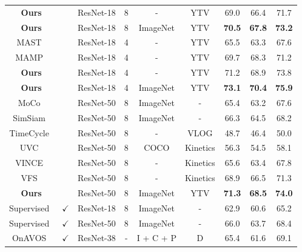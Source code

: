 \documentclass{article}
\begin{document}
\begin{table}[t]
{\begin{tabular}{ccccccccc}
			\textbf{Ours} & & ResNet-18 & 8 & - & YTV
			& 69.0 & 66.4 & 71.7 \\
      \textbf{Ours} & & ResNet-18 & 8 & ImageNet & YTV
			& \textbf{70.5} & \textbf{67.8} & \textbf{73.2} \\
      \hline
      MAST~\cite{lai2020mast} & & ResNet-18 & 4 & - & YTV
			& 65.5 & 63.3  & 67.6  \\
      MAMP~\cite{miao2021self} & & ResNet-18 & 4 & - & YTV
			& 69.7 & 68.3   & 71.2  \\
      \textbf{Ours} & & ResNet-18 & 4 & - & YTV
			& 71.2  & 68.9 & 73.8 \\
      \textbf{Ours} & & ResNet-18 & 4 & ImageNet & YTV
			& \textbf{73.1} & \textbf{70.4} & \textbf{75.9} \\
			\hline
      MoCo~\cite{he2020momentum} & & ResNet-50 & 8 & ImageNet &-
			& 65.4 & 63.2  & 67.6  \\
      SimSiam~\cite{chen2021exploring} & & ResNet-50 & 8 & ImageNet &-
			& 66.3 & 64.5  & 68.2  \\
      TimeCycle~\cite{wang2019learning} & & ResNet-50 & 8 & - & VLOG
			& 48.7 & 46.4  & 50.0  \\
      UVC~\cite{li2019joint}  & & ResNet-50 & 8 & COCO & Kinetics
			& 56.3 & 54.5  & 58.1  \\
      VINCE~\cite{gordon2020watching} & & ResNet-50 & 8 & - & Kinetics
			& 65.6 & 63.4  & 67.8  \\
      VFS~\cite{xu2021rethinking}  & & ResNet-50 & 8 & - & Kinetics
			& 68.9 & 66.5 & 71.3    \\
      \textbf{Ours} & & ResNet-50 & 8 & ImageNet & YTV
			& \textbf{71.3}  & \textbf{68.5} & \textbf{74.0}  \\
      \hline
      Supervised~\cite{he2016deep} &$\checkmark$ & ResNet-18 & 8 & ImageNet & -
			& 62.9 & 60.6  & 65.2  \\
      Supervised~\cite{he2016deep} & $\checkmark$& ResNet-50 & 8 & ImageNet &-
			& 66.0 & 63.7  & 68.4  \\
      OnAVOS~\cite{voigtlaender2017online} & $\checkmark$ & ResNet-38 & - & I + C + P & D
			& 65.4 & 61.6  & 69.1  \\

\end{tabular}}
\end{table}
\end{document}
